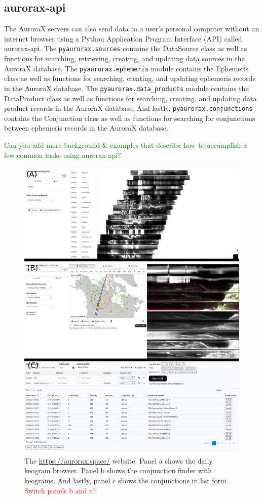\documentclass[draft]{agujournal2019}
\begin{document}
\subsection{aurorax-api}
The AuroraX servers can also send data to a user's personal computer without an internet browser using a Python Application Program Interface (API) called aurorax-api. The \verb|pyaurorax.sources| contains the DataSource class as well as functions for searching, retrieving, creating, and updating data sources in the AuroraX database. The \verb|pyaurorax.ephemeris| module contains the Ephemeris class as well as functions for searching, creating, and updating ephemeris records in the AuroraX database. The \verb|pyaurorax.data_products| module contains the DataProduct class as well as functions for searching, creating, and updating data product records in the AuroraX database. And lastly, \verb|pyaurorax.conjunctions| contains the Conjunction class as well as functions for searching for conjunctions between ephemeris records in the AuroraX database. 

\textcolor{green}{Can you add more background & examples that describe how to accomplish a few common tasks using aurorax-api?}

\begin{figure}
      \includegraphics[width=\textwidth]{figures/fig1.png}
      \caption{The \url{https://aurorax.space/} website. Panel a shows the daily keogram browser. Panel b shows the conjunction finder with keograms. And lastly, panel c shows the conjunctions in list form. \textcolor{red}{Switch panels b and c?}}
      \label{fig1}
\end{figure}
\end{document}
